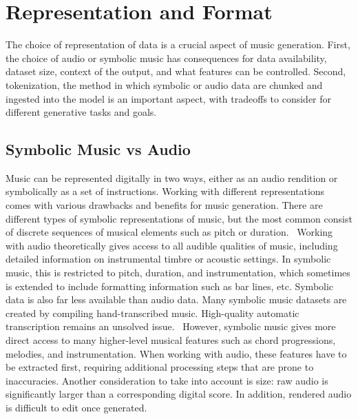\section{Representation and Format}\label{section:representation}
The choice of representation of data is a crucial aspect of music generation. First, the choice of audio or symbolic music has consequences for data availability, dataset size, context of the output, and what features can be controlled. Second, tokenization, the method in which symbolic or audio data are chunked and ingested into the model is an important aspect, with tradeoffs to consider for different generative tasks and goals. 


\subsection{Symbolic Music vs Audio}\label{section:symbolic_audio}
Music can be represented digitally in two ways, either as an audio rendition or symbolically as a set of instructions. Working with different representations comes with various drawbacks and benefits for music generation. There are different types of symbolic representations of music, but the most common consist of discrete sequences of musical elements such as pitch or duration.  Working with audio theoretically gives access to all audible qualities of music, including detailed information on instrumental timbre or acoustic settings. In symbolic music, this is restricted to pitch, duration, and instrumentation, which sometimes is extended to include formatting information such as bar lines, etc. 
Symbolic data is also far less available than audio data. Many symbolic music datasets are created by compiling hand-transcribed music. High-quality automatic transcription remains an unsolved issue.\cite{Ji_Yang_Luo_survey_symbolic_2024}\cite{Chen_Smith_Spijkervet_Wang_Zou_Li_Kong_Du_2024}  However, symbolic music gives more direct access to many higher-level musical features such as chord progressions, melodies, and instrumentation. When working with audio, these features have to be extracted first, requiring additional processing steps that are prone to inaccuracies. 
Another consideration to take into account is size: raw audio is significantly larger than a corresponding digital score. In addition, rendered audio is difficult to edit once generated. 


